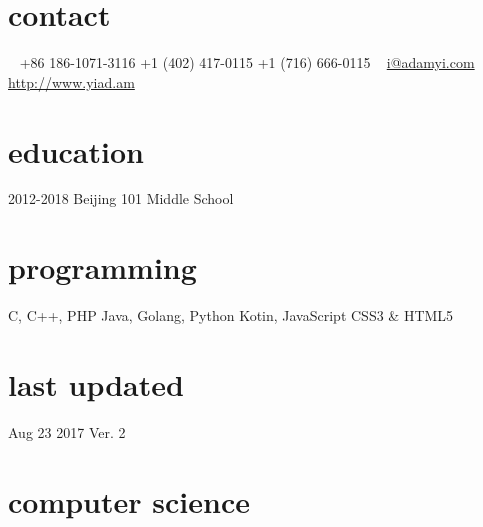 \documentclass[]{adamyi-cv} %
\begin{document}


\begin{aside} %
\section{contact}
~
+86 186-1071-3116
+1 (402) 417-0115
+1 (716) 666-0115
~
\href{mailto:i@adamyi.com}{i@adamyi.com}
\href{https://www.yiad.am}{http://www.yiad.am}
\section{education}
2012-2018 Beijing 101 Middle School
\section{programming}
C, C++, PHP
Java, Golang, Python
Kotin, JavaScript
CSS3 \& HTML5
\section{last updated}
Aug 23 2017
Ver. 2
\end{aside}


\section{computer science}
\end{document}
